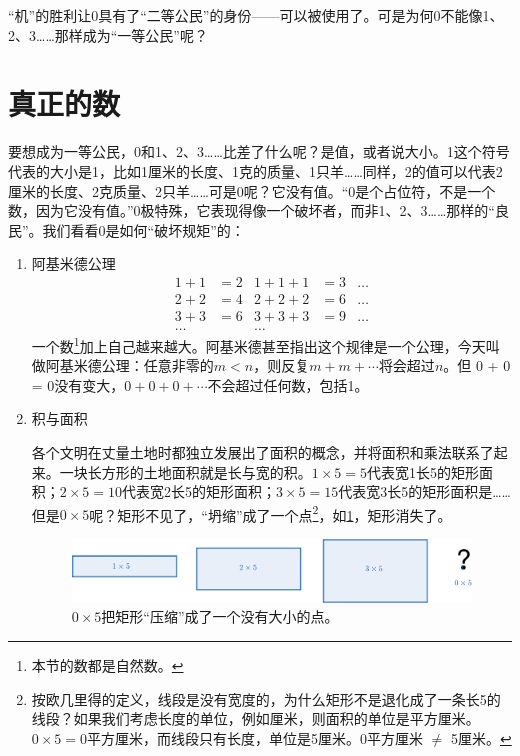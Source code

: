 \documentclass[b5paper]{ctexart}
\begin{document}
“机”的胜利让0具有了“二等公民”的身份——可以被使用了。可是为何0不能像1、2、3……那样成为“一等公民”呢？

\section{真正的数}

要想成为一等公民，0和1、2、3……比差了什么呢？是值，或者说大小。1这个符号代表的大小是1，比如1厘米的长度、1克的质量、1只羊……同样，2的值可以代表2厘米的长度、2克质量、2只羊……可是0呢？它没有值。“0是个占位符，不是一个数，因为它没有值\cite{Seife-2000}。”0极特殊，它表现得像一个破坏者，而非1、2、3……那样的“良民”。我们看看0是如何“破坏规矩”的：

\begin{enumerate}[(1)]
\item 阿基米德公理 
\begin{align*}
1 + 1 &= 2   & 1 + 1 + 1 &= 3 & \dots \\
2 + 2 &= 4   & 2 + 2 + 2 &= 6 & \dots \\
3 + 3 &= 6   & 3 + 3 + 3 &= 9 & \dots \\
\dots &      & \dots     &    &
\end{align*}
一个数\footnote{本节的数都是自然数。}加上自己越来越大。阿基米德甚至指出这个规律是一个公理，今天叫做阿基米德公理：任意非零的$m < n$，则反复$m + m + \cdots$将会超过$n$。但 0 + 0 = 0没有变大，$0 + 0 + 0 + \cdots$不会超过任何数，包括1。

\item 积与面积

各个文明在丈量土地时都独立发展出了面积的概念，并将面积和乘法联系了起来。一块长方形的土地面积就是长与宽的积。$1 \times 5 = 5$代表宽1长5的矩形面积；$2 \times 5 = 10$代表宽2长5的矩形面积；$3 \times 5 = 15$代表宽3长5的矩形面积是……但是$0 \times 5$呢？矩形不见了，“坍缩”成了一个点\footnote{按欧几里得的定义，线段是没有宽度的，为什么矩形不是退化成了一条长5的线段？如果我们考虑长度的单位，例如厘米，则面积的单位是平方厘米。$0 \times 5 = 0$平方厘米，而线段只有长度，单位是5厘米。0平方厘米 $\neq$ 5厘米。}，如\cref{fig:rectangle-vanish}，矩形消失了。

\begin{figure}[htbp]
 \centering
 \includegraphics[scale=0.6]{img/rectangles}
 \caption{$0 \times 5$把矩形“压缩”成了一个没有大小的点。}
 \label{fig:rectangle-vanish}
\end{figure}


\end{enumerate}
\end{document}
